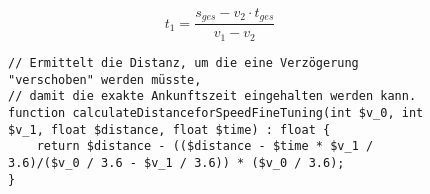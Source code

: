 \begin{equation}
\label{eq:t_1_tuning}
t_{1} = \frac{s_{ges} - v_{2} \cdot t_{ges}}{v_{1} - v_{2}}
\end{equation}
\begin{figure}[H]
\begin{lstlisting}[caption={\textit{calculateDistanceforSpeedFineTuning$($$)$} (\textit{functions\_math.php})},captionpos=b,label={lst:calculateDistanceforSpeedFineTuning}]
// Ermittelt die Distanz, um die eine Verzögerung "verschoben" werden müsste,
// damit die exakte Ankunftszeit eingehalten werden kann.
function calculateDistanceforSpeedFineTuning(int $v_0, int $v_1, float $distance, float $time) : float {
	return $distance - (($distance - $time * $v_1 / 3.6)/($v_0 / 3.6 - $v_1 / 3.6)) * ($v_0 / 3.6);
}
\end{lstlisting}
\end{figure}